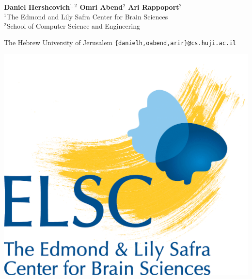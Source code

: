 \documentclass[a0,portrait]{a0poster}
\begin{document}
\hspace{1cm}
\begin{minipage}[b]{0.57\linewidth}
\LARGE \textbf{Daniel Hershcovich$^{1,2}$ \And Omri Abend$^2$ \And Ari Rappoport$^2$} \\[0.5cm] %
\Large $^1$The Edmond and Lily Safra Center for Brain Sciences \\
  $^2$School of Computer Science and Engineering
  \setlength{\columnseprule}{0pt}
  \setlength\multicolsep{-20pt}
  \begin{multicols}{2}
  The Hebrew University of Jerusalem
  \large \texttt{\{danielh,oabend,arir\}@cs.huji.ac.il}
  \end{multicols}
\end{minipage}
\hfill
\begin{minipage}[b]{.13\linewidth}
\includegraphics[width=\linewidth]{elsc_logo.png}
\end{minipage}

\vspace{1cm} %



\color{Navy} %
\end{document}
